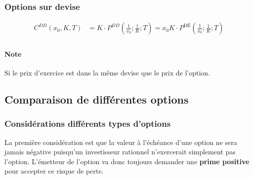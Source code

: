 \documentclass[10pt, french]{article}
\begin{document}
\begin{multicols*}{2}
\subsubsection*{Options sur devise}
\begin{align*}
	C^{DD}(x_0, K, T) 
	&= 	K \cdot P^{DD}\left( \frac{1}{x_0}; \frac{1}{K}; T \right) 
	= 	x_0	K \cdot P^{\text{DÉ}} \left( \frac{1}{x_0}; \frac{1}{K}; T \right) \\
\end{align*}

\paragraph{Note}	Si le prix d'exercice est dans la même devise que le prix de l'option.


\subsection*{Comparaison de différentes options}

%
%

\subsubsection*{Considérations différents types d'options}

La première considération est que la valeur à l'échéance d'une option ne sera jamais négative puisqu'un investisseur \og rationnel \fg{} n'exercerait simplement pas l'option. L'émetteur de l'option va donc toujours demander une \textbf{prime positive} pour accepter ce risque de perte.\\


\end{multicols*}
\end{document}
